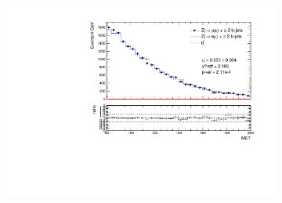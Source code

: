\documentclass{article}
\begin{document}
\begin{figure}
\begin{center}
\begin{subfigure}[b]{0.45\textwidth}
	\end{subfigure}
	\begin{subfigure}[b]{0.45\textwidth}
		\includegraphics[width=\linewidth]{Zmm_MET_2018.pdf}
	\end{subfigure}
\end{center}
\end{figure}

\newpage
\end{document}
